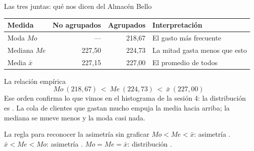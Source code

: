 \documentclass[aspectratio=169,10pt]{beamer}
\begin{document}
\begin{frame}{Las tres juntas: qué nos dicen del Almacén Bello}
  \scriptsize
  \begin{center}
  \begin{tabular}{@{}lrrl@{}}
    \toprule
    \textbf{Medida} & \textbf{No agrupados} & \textbf{Agrupados} &
    \textbf{Interpretación} \\
    \midrule
    Moda $Mo$    & --- & 218{,}67 & El gasto más frecuente \\
    Mediana $Me$ & 227{,}50 & 224{,}73 & La mitad gasta menos que esto \\
    Media $\bar{x}$ & 227{,}15 & 227{,}00 & El promedio de todos \\
    \bottomrule
  \end{tabular}
  \end{center}

  \vspace{0.15cm}
  \begin{exampleblock}{La relación empírica}
    \scriptsize
    \[ Mo\ (218{,}67) \ < \ Me\ (224{,}73) \ < \ \bar{x}\ (227{,}00) \]
    Ese orden confirma lo que vimos en el histograma de la sesión 4: la
    distribución es . La cola de clientes que
    gastan mucho empuja la media hacia arriba; la mediana se mueve menos y la
    moda casi nada.
  \end{exampleblock}

  \vspace{0.05cm}
  \begin{alertblock}{La regla para reconocer la asimetría sin graficar}
    \tiny
    $Mo < Me < \bar{x}$: asimetría . \quad
    $\bar{x} < Me < Mo$: asimetría . \quad
    $Mo = Me = \bar{x}$: distribución .
  \end{alertblock}
\end{frame}
\end{document}
